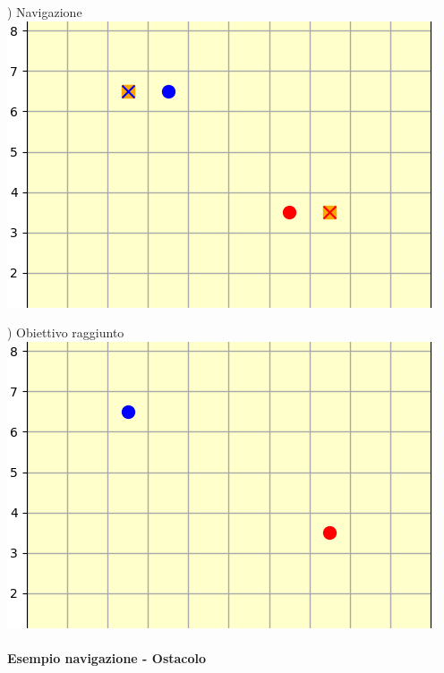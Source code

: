 \documentclass[12pt]{article}
\begin{document}
\noindent \begin{minipage}[ht]{0.45\linewidth}
) Navigazione
\includegraphics[width=\textwidth]{SimulazioniNavigazione/2AGV_NoConflitti/4.png}
\end{minipage}
\begin{minipage}[ht]{0.45\linewidth}
) Obiettivo raggiunto
\includegraphics[width=\textwidth]{SimulazioniNavigazione/2AGV_NoConflitti/5.png}
\end{minipage}

\newpage

\paragraph{Esempio navigazione - Ostacolo}
\vspace{0.2cm}
\end{document}
